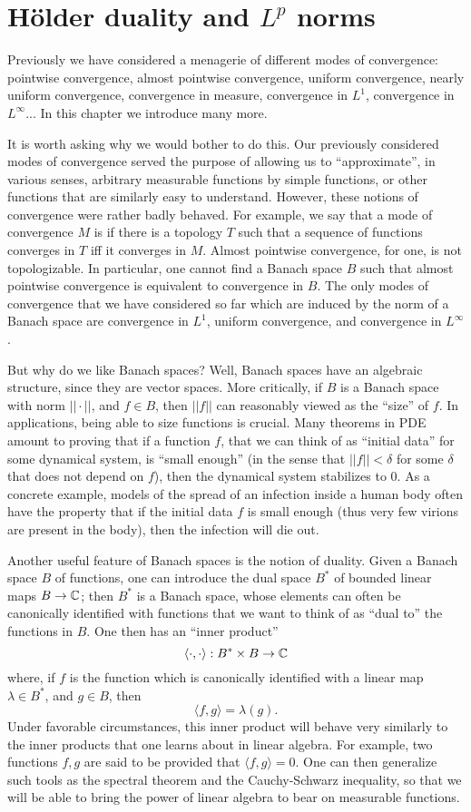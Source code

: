\chapter{H\"older duality and $L^p$ norms}
Previously we have considered a menagerie of different modes of convergence: pointwise convergence, almost pointwise convergence, uniform convergence, nearly uniform convergence, convergence in measure, convergence in $L^1$, convergence in $L^\infty$...
In this chapter we introduce many more.

It is worth asking why we would bother to do this.
Our previously considered modes of convergence served the purpose of allowing us to ``approximate'', in various senses, arbitrary measurable functions by simple functions, or other functions that are similarly easy to understand.
However, these notions of convergence were rather badly behaved.
For example, we say that a mode of convergence $M$ is  if there is a topology $T$ such that a sequence of functions converges in $T$ iff it converges in $M$.
Almost pointwise convergence, for one, is not topologizable.
In particular, one cannot find a Banach space $B$ such that almost pointwise convergence is equivalent to convergence in $B$.
The only modes of convergence that we have considered so far which are induced by the norm of a Banach space are convergence in $L^1$, uniform convergence, and convergence in $L^\infty$.

But why do we like Banach spaces? Well, Banach spaces have an algebraic structure, since they are vector spaces.
More critically, if $B$ is a Banach space with norm $||\cdot||$, and $f \in B$, then $||f||$ can reasonably viewed as the ``size'' of $f$.
In applications, being able to size functions is crucial.
Many theorems in PDE amount to proving that if a function $f$, that we can think of as ``initial data'' for some dynamical system, is ``small enough'' (in the sense that $||f|| < \delta$ for some $\delta$ that does not depend on $f$), then the dynamical system stabilizes to $0$.
As a concrete example, models of the spread of an infection inside a human body often have the property that if the initial data $f$ is small enough (thus very few virions are present in the body), then the infection will die out.

Another useful feature of Banach spaces is the notion of duality.
Given a Banach space $B$ of functions, one can introduce the dual space $B^*$ of bounded linear maps $B \to \mathbb{C}$; then $B^*$ is a Banach space, whose elements can often be canonically identified with functions that we want to think of as ``dual to'' the functions in $B$.
One then has an ``inner product''
\[\langle \cdot, \cdot\rangle: B^* \times B \to \mathbb{C}\]
where, if $f$ is the function which is canonically identified with a linear map $\lambda \in B^*$, and $g \in B$, then
\[\langle f, g\rangle = \lambda(g).\]
Under favorable circumstances, this inner product will behave very similarly to the inner products that one learns about in linear algebra.
For example, two functions $f, g$ are said to be  provided that $\langle f, g\rangle = 0$.
One can then generalize such tools as the spectral theorem and the Cauchy-Schwarz inequality, so that we will be able to bring the power of linear algebra to bear on measurable functions.

